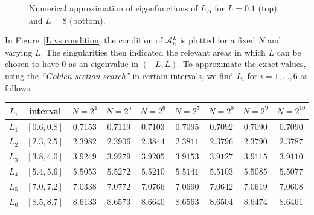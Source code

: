 \documentclass[11 pt]{article}
\numberwithin{equation}{section}
\begin{document}
\begin{figure}[htb]
{
	}\quad
	\caption{Numerical approximation of eigenfunctions of \( L_{\Delta} \) for  $L = 0.1$ (top) and $L = 8$ (bottom).
}
	\label{Fig:eigen}
\end{figure}






In Figure~\ref{L vs condition} the condition of $\mathcal{A}^L_h$ is plotted for a fixed $N$ and varying $L$. The singularities then indicated the relevant areas in which $L$ can be chosen to have $0$ as an eigenvalue in $(-L,L)$. To approximate the exact values, using the \textit{``Golden-section search''} in certain intervals, we find $L_i$ for $i=1,\ldots,6$ as follows.

%

\begin{center}
\begin{tabular}{c|c|ccccccc}
$L_i$ & interval & $N=2^4$ & $N=2^5$ & $N=2^6$ & $N=2^7$ & $N=2^8$ & $N=2^9$ & $N=2^{10}$\\
\hline
$L_1$ & $[0.6,0.8]$ & $0.7153$ &$0.7119 $ &$0.7103$ & $0.7095$ & $0.7092$ & $ 0.7090$ &$ 0.7090$\\
$L_2$ & $[2.3,2.5]$ & $2.3982$ &$2.3906$ &$2.3844$ & $2.3811$ &$2.3796$ &$2.3790$&$2.3787$\\
$L_3$ & $[3.8,4.0]$ & $3.9249  $ &$3.9279 $ &$3.9205 $ & $3.9153$ &$3.9127 $ &$3.9115$&$3.9110$\\
$L_4$ & $[5.4,5.6]$ & $5.5053$ &$5.5272 $ &$5.5210$ & $5.5141 $ &$ 5.5103 $ &$5.5085$&$5.5077$\\
$L_5$ & $[7.0,7.2]$ & $7.0338$ &$ 7.0772 $ &$7.0766 $ & $7.0690$ &$ 7.0642  $ &$7.0619$&$7.0608$\\
$L_6$ & $[8.5,8.7]$ & $8.6133$ &$8.6573 $ &$8.6640$ & $8.6563$ &$8.6504$ &$8.6474$&$8.6461$
\end{tabular} 
\end{center}           
\end{document}
